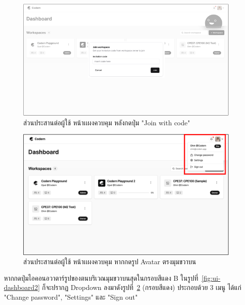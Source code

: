 \documentclass[12pt,one side,openright,a4paper]{cpe-thesis-th}
\newcommand{\thaijustify}[1]{%
  \par\hspace{30pt}\justifying
  #1
}
\begin{document}
    \hypertarget{ui-dashboard4}{
        \begin{figure}[H]
        \centering
            \includegraphics[width=15cm]{figure/ui/ui-dashboard4.png}
            \caption[ส่วนประสานต่อผู้ใช้ หน้าเเผงควบคุม (กดปุ่ม "Join with code")]{ส่วนประสานต่อผู้ใช้ หน้าเเผงควบคุม หลังกดปุ่ม "Join with code" }
            \label{fig:ui-dashboard4}
        \end{figure}
    }

    \hypertarget{ui-dashboard5}{
        \begin{figure}[H]
        \centering
            \includegraphics[width=15cm]{figure/ui/ui-dashboard5.png}
            \caption[ส่วนประสานต่อผู้ใช้ หน้าเเผงควบคุม (กดตรงรูป Avatar)]{ ส่วนประสานต่อผู้ใช้ หน้าเเผงควบคุม หากกดรูป Avatar ตรงมุมขวาบน}
            \label{fig:ui-dashboard5}
        \end{figure}
    }
    
    \thaijustify{
        หากกดปุ่มไอคอนอวาตาร์รูปของตนบริเวณมุมขวาบนสุดในกรอบสีแดง B ในรูปที่~\ref{fig:ui-dashboard2} ก็จะปรากฏ Dropdown ลงมาดังรูปที่~\ref{fig:ui-dashboard5} (กรอบสีแดง) ประกอบด้วย 3 เมนู ได้แก่ "Change password", "Settings" และ "Sign out"

    }
\end{document}
